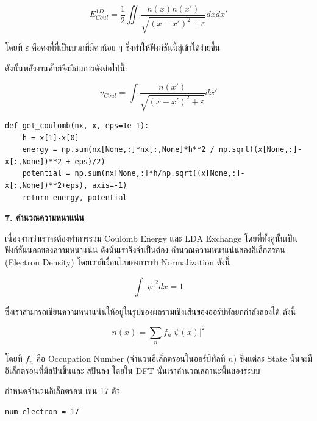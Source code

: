 \begin{equation}
    E^{1D}_{Coul} = \frac{1}{2}\iint \frac{n(x)n(x')}{\sqrt{(x-x')^2+\varepsilon}}dxdx'
\end{equation}

\noindent โดยที่ $\varepsilon$ คือคงที่ที่เป็นบวกที่มีค่าน้อย ๆ ซึ่งทำให้ฟังก์ชันนี้ลู่เข้าได้ง่ายขึ้น

\noindent ดังนั้นพลังงานศักย์จึงมีสมการดังต่อไปนี้:

\begin{equation}
    v_{Coul} = \int \frac{n(x')}{\sqrt{(x-x')^2+\varepsilon}}dx'
\end{equation}

\vspace{1em}
\begin{lstlisting}[style=MyPython]
def get_coulomb(nx, x, eps=1e-1):
    h = x[1]-x[0]
    energy = np.sum(nx[None,:]*nx[:,None]*h**2 / np.sqrt((x[None,:]-x[:,None])**2 + eps)/2)
    potential = np.sum(nx[None,:]*h/np.sqrt((x[None,:]-x[:,None])**2+eps), axis=-1)
    return energy, potential
\end{lstlisting}

\vspace{1em}
\noindent \textbf{7. คำนวณความหนาแน่น}

เนื่องจากว่าเราจะต้องทำการรวม Coulomb Energy และ LDA Exchange โดยที่ทั้งคู่นั้นเป็นฟังก์ชันนอลของความหนาแน่น ดังนั้นเราจึงจำเป็นต้อง%
คำนวณความหนาแน่นของอิเล็กตรอน (Electron Density) โดยเรามีเงื่อนไขของการทำ Normalization ดังนี้

\begin{equation}
    \int \lvert \psi \rvert ^2 dx = 1
\end{equation}

\noindent ซึ่งเราสามารถเขียนความหนาแน่นให้อยู่ในรูปของผลรวมเชิงเส้นของออร์บิทัลยกกำลังสองได้ ดังนี้ 

\begin{equation}
    n(x)=\sum_n f_n \lvert \psi(x) \rvert ^2
\end{equation}

\noindent โดยที่ $f_n$ คือ Occupation Number (จำนวนอิเล็กตรอนในออร์บิทัลที่ $n$) ซึ่งแต่ละ State นั้นจะมีอิเล็กตรอนที่มีสปินขึ้นและ%
สปินลง โดยใน DFT นั้นเราคำนวณสถานะพื้นของระบบ

\noindent กำหนดจำนวนอิเล็กตรอน เช่น 17 ตัว

\begin{lstlisting}[style=MyPython]
num_electron = 17
\end{lstlisting}

